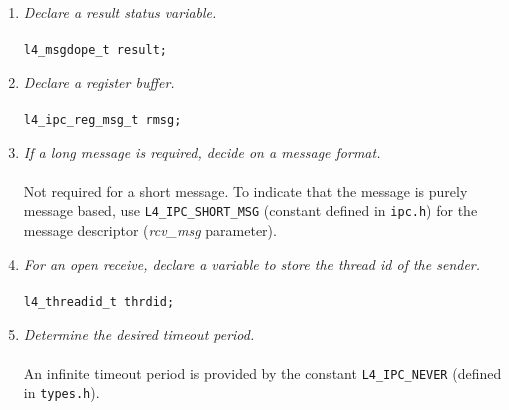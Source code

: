 \begin{enumerate}

\item \emph{Declare a result status variable.} \\ \\
  \hspace*{20pt} {\footnotesize\verb+l4_msgdope_t result;+}

\item \emph{Declare a register buffer.} \\ \\
  \hspace*{20pt} {\footnotesize\verb+l4_ipc_reg_msg_t rmsg;+} \\ 

\item \emph{If a long message is required, decide on a message format.}
  \\ \\ \hspace*{10pt}
  Not required for a short message. To indicate that the message is 
  purely message based, use {\footnotesize\verb+L4_IPC_SHORT_MSG+} (constant defined in
  {\footnotesize\verb+ipc.h+}) for the message descriptor (\emph{rcv\_msg} parameter).

\item \emph{ For an open receive, declare a variable to store the thread id of the sender.} \\
  \\ \hspace*{20pt} {\footnotesize\verb+l4_threadid_t thrdid;+}
  
\item \emph{Determine the desired timeout period.} \\ \\ \hspace*{10pt}
  An infinite timeout period is provided by the constant 
  {\footnotesize\verb+L4_IPC_NEVER+} (defined in {\footnotesize\verb+types.h+}). 
  

\end{enumerate}
